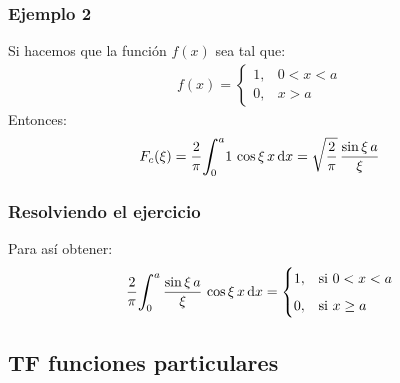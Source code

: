 \begin{frame}
\frametitle{Ejemplo 2}
Si hacemos que la función $f (x)$ sea tal que:
\pause
\begin{align*}
f (x) = \begin{cases}
1, & 0 < x < a \\[0.5em]
0, & x > a
\end{cases}
\end{align*}
\pause
Entonces:
\pause
\begin{align*}
F_{c}(\xi) = \dfrac{2}{\pi} \scaleint{6ex}_{\bs 0}^{a} 1 \, \cos \xi \, x \dd{x} = \sqrt{\dfrac{2}{\pi}} \, \dfrac{\sin \xi \, a}{\xi}
\end{align*}
\end{frame}
\begin{frame}
\frametitle{Resolviendo el ejercicio}
Para así obtener:
\pause
\begin{align*}
\dfrac{2}{\pi} \scaleint{6ex}_{\bs 0}^{a} \, \dfrac{\sin \xi \, a}{\xi} \, \cos \xi \, x \dd{x} = \begin{cases}
1, & \mbox{si } 0 < x < a \\[0.5em]
0, & \mbox{si } x \geq a
\end{cases}
\end{align*}
\end{frame}

\subsection{TF funciones particulares}

